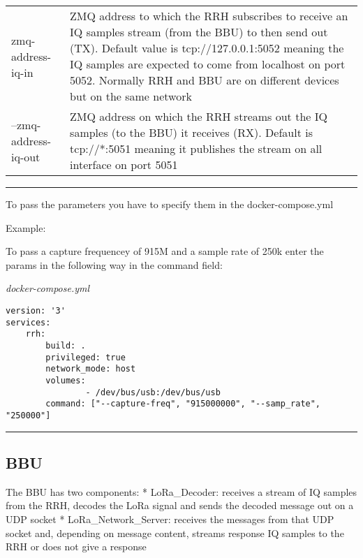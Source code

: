 \begin{longtable}[]{@{}ll@{}}
\begin{minipage}[t]{0.18\columnwidth}
zmq-address-iq-in\strut
\end{minipage} & \begin{minipage}[t]{0.18\columnwidth}\raggedright\strut
ZMQ address to which the RRH subscribes to receive an IQ samples stream
(from the BBU) to then send out (TX). Default value is
tcp://127.0.0.1:5052 meaning the IQ samples are expected to come from
localhost on port 5052. Normally RRH and BBU are on different devices
but on the same network\strut
\end{minipage}\tabularnewline
\begin{minipage}[t]{0.18\columnwidth}\raggedright\strut
--zmq-address-iq-out\strut
\end{minipage} & \begin{minipage}[t]{0.18\columnwidth}\raggedright\strut
ZMQ address on which the RRH streams out the IQ samples (to the BBU) it
receives (RX). Default is tcp://*:5051 meaning it publishes the stream
on all interface on port 5051\strut
\end{minipage}\tabularnewline
\bottomrule
\end{longtable}

\begin{center}\rule{0.5\linewidth}{\linethickness}\end{center}

To pass the parameters you have to specify them in the
docker-compose.yml

Example:

To pass a capture frequencey of 915M and a sample rate of 250k enter the
params in the following way in the command field:

\emph{docker-compose.yml}

\begin{verbatim}
version: '3'
services:
    rrh:
        build: .
        privileged: true
        network_mode: host
        volumes:
                - /dev/bus/usb:/dev/bus/usb
        command: ["--capture-freq", "915000000", "--samp_rate", "250000"]
\end{verbatim}

\begin{center}\rule{0.5\linewidth}{\linethickness}\end{center}

\subsection{BBU}\label{bbu}

The BBU has two components: * LoRa\_Decoder: receives a stream of IQ
samples from the RRH, decodes the LoRa signal and sends the decoded
message out on a UDP socket * LoRa\_Network\_Server: receives the
messages from that UDP socket and, depending on message content, streams
response IQ samples to the RRH or does not give a response

